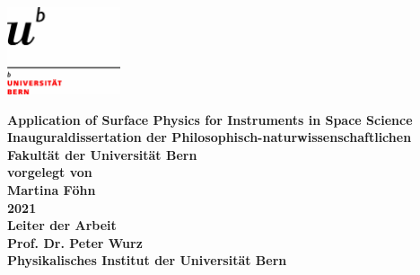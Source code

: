 \documentclass[a4paper, 12pt, abstracton]{scrartcl}
\begin{document}
\renewcommand{\arraystretch}{1.5} %
\selectfont			%

\begin{titlepage}
	
	\begin{flushright}
		\includegraphics[width=0.25\textwidth]{Bilder/logo-uni.jpg}\\[2cm]    
	\end{flushright}
	
	\begin{center} %
		\huge \bfseries Application of Surface Physics for Instruments in Space Science\\[2cm]
		\Large Inauguraldissertation der Philosophisch-naturwissenschaftlichen Fakultät der Universität Bern\\[2cm]
		\Large vorgelegt von\\[0.1cm]
		\Large Martina Föhn\\[1cm]
		\Large 2021\\[1.5cm] %
		\Large Leiter der Arbeit\\[0.1cm]
		\Large Prof. Dr. Peter Wurz\\[1cm]
		\Large Physikalisches Institut der Universität Bern\\
		
	\end{center}
\end{titlepage}

	
	\newpage
	\thispagestyle{empty}
	\null
	\newpage
	\begin{abstract}

	\end{abstract}
	\newpage
	\thispagestyle{empty}
	\null
	\newpage

	\tableofcontents

	\newpage
	\thispagestyle{empty}
	\null
	\newpage
	
\end{document}
